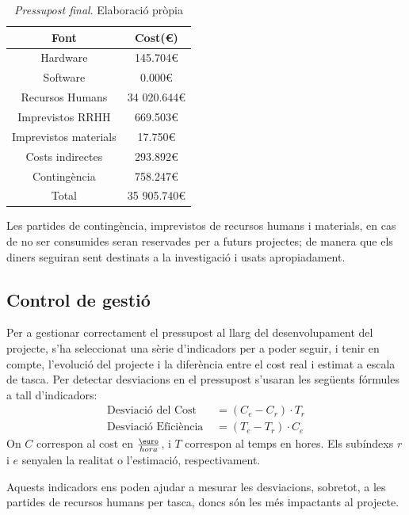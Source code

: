 \documentclass[a4paper]{article} %
\begin{document}
	\begin{table}[h!]
		\centering
		\begin{tabular}{|| c | c ||}
			\hline
			\textbf{Font} & \textbf{Cost(\euro)} \\
			\hline \hline
			Hardware & 145.704\euro \\
			Software & 0.000\euro \\
			Recursos Humans & 34 020.644\euro \\
			Imprevistos RRHH & 669.503\euro \\
			Imprevistos materials & 17.750\euro \\
			Costs indirectes & 293.892\euro \\
			Contingència  & 758.247\euro \\
			\hline \hline
			Total & 35 905.740\euro \\
			\hline
		\end{tabular}
		\caption[\textit{Pressupost final}]{\textit{\small Pressupost final}. Elaboració pròpia}
		\label{table:pressupostFinal}
	\end{table}
	Les partides de contingència, imprevistos de recursos humans i materials, en cas de no ser consumides seran reservades per a futurs projectes; de manera que els diners seguiran sent destinats a la investigació i usats apropiadament.
	
	\subsection{Control de gestió}
	Per a gestionar correctament el pressupost al llarg del desenvolupament del projecte, s'ha seleccionat una sèrie d'indicadors per a poder seguir, i tenir en compte, l'evolució del projecte i la diferència entre el cost real i estimat a escala de tasca. Per detectar desviacions en el pressupost s'usaran les següents fórmules a tall d'indicadors:
	\begin{equation*}
	\begin{split}
		\text{Desviació del Cost } &= (C_e-C_r) \cdot T_r \\ 
		\text{Desviació Eficiència } &= (T_e - T_r) \cdot C_e 
	\end{split}
	\end{equation*}
	On $C$ correspon al cost en $\frac{\text{\euro}}{hora}$, i $T$ correspon al temps en hores. Els subíndexs $r$ i $e$ senyalen la realitat o l'estimació, respectivament. \par
	Aquests indicadors ens poden ajudar a mesurar les desviacions, sobretot, a les partides de recursos humans per tasca, doncs són les més impactants al projecte.
	
\end{document}
